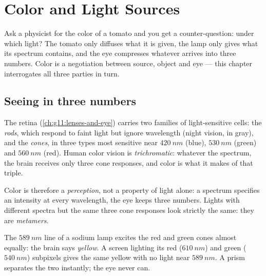 \chapter{Color and Light Sources}\label{ch:g11:color-light-sources}

Ask a physicist for the color of a tomato and you get a counter-question:
under which light? The tomato only diffuses what it is given, the lamp
only gives what its spectrum contains, and the eye compresses whatever
arrives into three numbers. Color is a negotiation between source,
object and eye --- this chapter interrogates all three parties in turn.

\section{Seeing in three numbers}

\begin{definition}\label{def:g11:color-light-sources:cones}
The retina (\cref{ch:g11:lenses-and-eye}) carries two families of
light-sensitive cells: the \emph{rods}, which respond to
faint light but ignore wavelength (night vision, in gray), and the
\emph{cones}, in three types most sensitive near
$\qty{420}{nm}$ (blue), $\qty{530}{nm}$ (green) and $\qty{560}{nm}$
(red). Human color vision is
\emph{trichromatic}: whatever the spectrum,
the brain receives only three cone responses, and color is what it
makes of that triple.
\end{definition}

\begin{definition}\label{def:g11:color-light-sources:perception}
Color is therefore a \emph{perception}, not a property of light alone:
a spectrum specifies an intensity at every wavelength, the eye keeps
three numbers. Lights with different spectra but the same three cone
responses look strictly the same: they are \emph{metamers}.
\end{definition}

\begin{example}\label{ex:g11:color-light-sources:yellows}
The $\qty{589}{nm}$ line of a sodium lamp excites the red and green
cones almost equally: the brain says \emph{yellow}. A screen lighting
its red ($\qty{610}{nm}$) and green ($\qty{540}{nm}$) subpixels gives
the same yellow with no light near $\qty{589}{nm}$. A prism separates
the two instantly; the eye never can.
\end{example}

